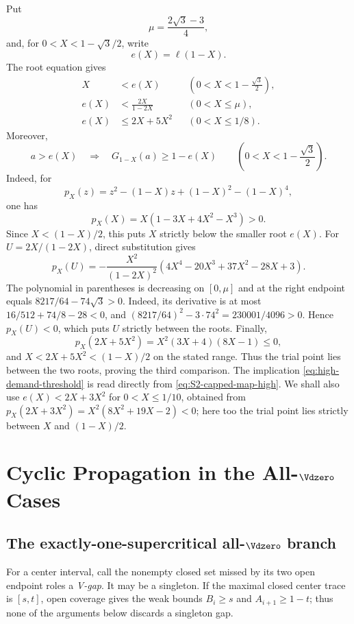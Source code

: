 Put
\[
 \mu=\frac{2\sqrt3-3}{4},
\]
and, for $0<X<1-\sqrt3/2$, write
\[
 e(X)=\ell(1-X).
\]
The root equation gives
\begin{equation}
 \begin{aligned}
 X&<e(X) &&\left(0<X<1-\frac{\sqrt3}{2}\right),\\
 e(X)&<\frac{2X}{1-2X} &&(0<X\le\mu),\\
 e(X)&\le2X+5X^2 &&(0<X\le1/8).
 \end{aligned}
 \label{eq:low-root-bounds}
\end{equation}
Moreover,
\begin{equation}
 a>e(X)\quad\Longrightarrow\quad
 G_{1-X}(a)\ge1-e(X)
 \qquad\left(0<X<1-\frac{\sqrt3}{2}\right).
 \label{eq:high-demand-threshold}
\end{equation}
Indeed, for
\[
 p_X(z)=z^2-(1-X)z+(1-X)^2-(1-X)^4,
\]
one has
\[
 p_X(X)=X(1-3X+4X^2-X^3)>0.
\]
Since $X<(1-X)/2$, this puts $X$ strictly below the smaller root $e(X)$.
For $U=2X/(1-2X)$, direct substitution gives
\[
 p_X(U)=-\frac{X^2}{(1-2X)^2}
 (4X^4-20X^3+37X^2-28X+3).
\]
The polynomial in parentheses is decreasing on $[0,\mu]$ and at the right
endpoint equals $8217/64-74\sqrt3>0$.  Indeed, its derivative is at most
$16/512+74/8-28<0$, and
$(8217/64)^2-3\mathbin{\cdot}74^2=230001/4096>0$.  Hence $p_X(U)<0$, which puts $U$
strictly between the roots.  Finally,
\[
 p_X(2X+5X^2)=X^2(3X+4)(8X-1)\le0,
\]
and $X<2X+5X^2<(1-X)/2$ on the stated range.  Thus the trial point lies
between the two roots, proving the third comparison.  The implication
\eqref{eq:high-demand-threshold} is read directly from
\eqref{eq:S2-capped-map-high}.  We shall also use
$e(X)<2X+3X^2$ for $0<X\le1/10$, obtained from
$p_X(2X+3X^2)=X^2(8X^2+19X-2)<0$; here too the trial point lies strictly
between $X$ and $(1-X)/2$.

\section{Cyclic Propagation in the All-$\Vdzero$ Cases}
\label{sec:cyclic-all-vd0}

\subsection{The exactly-one-supercritical all-$\Vdzero$ branch}

For a center interval, call the nonempty closed set missed by its two open
endpoint roles a \emph{V-gap}.  It may be a singleton.  If the maximal
closed center trace is $[s,t]$, open coverage gives the weak bounds
$B_i\ge s$ and $A_{i+1}\ge1-t$; thus none of the arguments below discards a
singleton gap.

